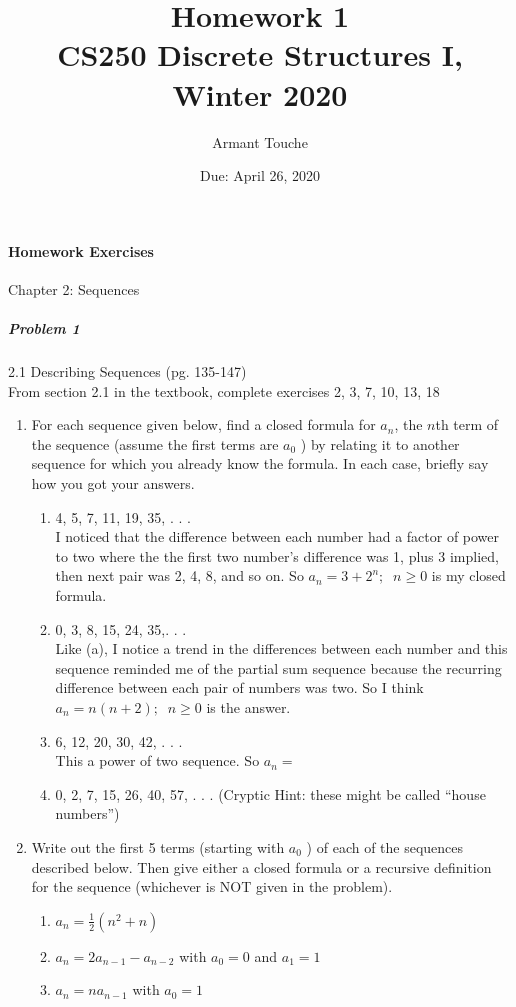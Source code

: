 \documentclass[11pt, a4paper]{article}
\title{\bf Homework 1\\[1ex]
\rm\normalsize CS250 Discrete Structures I, Winter 2020 }
\date{\normalsize Due: April 26, 2020}
\author{\normalsize Armant Touche}
\newcommand\setItemNumber[1]{\setcounter{enumi}{\numexpr#1-1\relax}}
\begin{document}
 
\vspace{0cm}\maketitle 
	\paragraph{Homework Exercises} Chapter 2: Sequences
	
	\subparagraph{Problem 1} 2.1 Describing Sequences (pg. 135-147)\\
			
		From section 2.1 in the textbook, complete exercises 2, 3, 7, 10, 13, 18

        \begin{enumerate}

            \setItemNumber{2}
            \item For each sequence given below, find a closed formula for $a_n$, the $n$th term of the sequence (assume the first terms are $a_0$ ) by relating it to another sequence for which you already know the formula. In each case, briefly say how you got your answers.
                \begin{enumerate}
                    \item 4, 5, 7, 11, 19, 35, . . .\\
                        I noticed that the difference between each number had a factor of power to two where the the first two number's difference was 1, plus 3 implied, then next pair was 2, 4, 8, and so on. So $a_n = 3 + 2^n;\;\;n\geq 0$ is my closed formula.
                    \item 0, 3, 8, 15, 24, 35,. . .\\
                        Like (a), I notice a trend in the differences between each number and this sequence reminded me of the partial sum sequence because the recurring difference between each pair of numbers was two. So I think $a_n = n(n + 2);\;\;n\geq 0$ is the answer.
                    \item 6, 12, 20, 30, 42, . . .\\
                        This a power of two sequence. So $a_n = $ %
                    \item 0, 2, 7, 15, 26, 40, 57, . . . (Cryptic Hint: these might be called “house numbers”)
                \end{enumerate}

            \item Write out the first 5 terms (starting with $a_0$ ) of each of the sequences described below. Then give either a closed formula or a recursive definition for the sequence (whichever is NOT given in the problem).
                \begin{enumerate}
                    \item $a_n = \frac{1}{2}(n^2 + n)$  
                    \item $a_n = 2a_{n - 1} - a_{n - 2}$ with $a_0 = 0$ and $a_1 = 1$
                    \item $a_n = na_{n - 1}$ with $a_0 = 1$
                \end{enumerate}


\end{enumerate}
\end{document}
